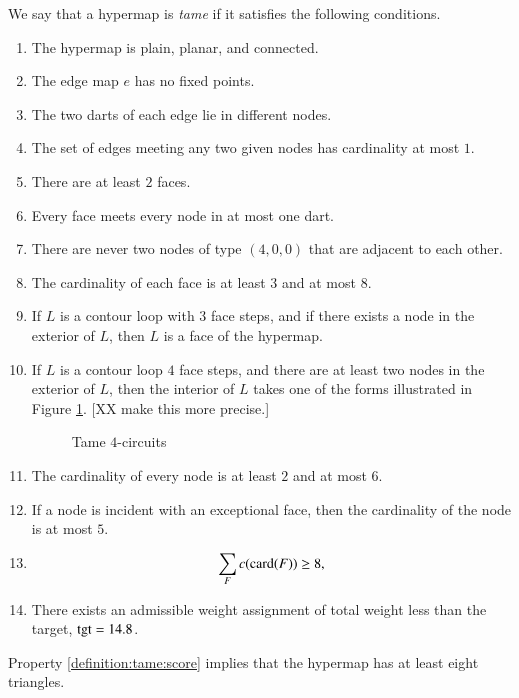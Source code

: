 We say that a hypermap is {\it tame\/} if it satisfies the following
conditions.
%

\begin{enumerate}
    \label{definition:tame}
    \item The hypermap is plain, planar, and connected.
    \item The edge map $e$ has no fixed points.
    \item The two darts of each edge lie in different nodes.
    \item The set of edges meeting any two given nodes has cardinality at most $1$.
    \item There are at least $2$ faces.
    \item Every face meets every node in at most one
        dart.
    \item There are never two nodes of type $(4,0,0)$ that are
    adjacent to each other.
    \label{definition:tame:40}
    \item The cardinality of each face is at least $3$ and at most $8$.
    \label{definition:tame:length}

    \item If $L$ is a contour loop with $3$ face steps, and if there exists a node in
    the exterior of $L$, then $L$ is a face of the hypermap.
    \label{definition:tame:3-circuit}

    \item If $L$ is a contour loop  $4$ face steps, and there are at least two nodes
    in the exterior of $L$, then the interior of $L$ takes one of the forms
    illustrated in Figure
    \ref{fig:fourcircuit}.  [XX make this more precise.]
    \label{definition:tame:4-circuit}
    \begin{figure}[htb]
        \centering
        \caption{Tame $4$-circuits}
        \label{fig:fourcircuit}
    \end{figure}

    \item The cardinality of every node is at least $2$ and at most
    $6$.
    \label{definition:tame:degree}

    \item If a node is incident with an exceptional face,
        then the cardinality of the node is at most $5$.
    \label{definition:tame:degreeE}

    \item $$\sum_F c({\operatorname{card}}(F)) \ge 8,$$
    \label{definition:tame:score}


    \item There exists an admissible weight assignment
        of total weight less than the target, ${\operatorname{tgt}}=14.8$.
    \label{definition:tame:squander}



\end{enumerate}
%
Property \ref{definition:tame:score} implies that the hypermap has
at least eight triangles.


